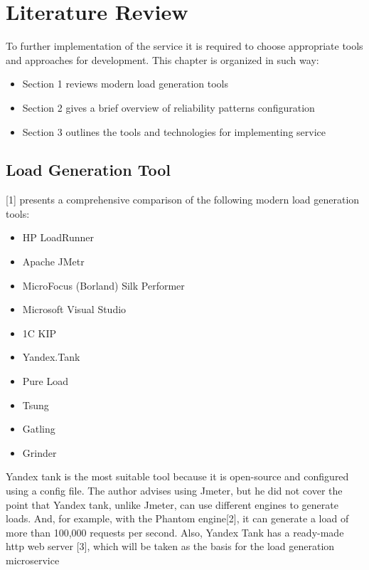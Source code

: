 
\chapter{Literature Review}
\label{ch:lr}


To further implementation of the service it is required to choose appropriate tools and approaches for development.
This chapter is organized in such way:

\begin{itemize}
    \item Section 1 reviews modern load generation tools
    \item Section 2 gives a brief overview of reliability patterns configuration
    \item Section 3 outlines the tools and technologies for implementing service
\end{itemize}

\section{Load Generation Tool}\label{sec:load-generation}
[1] presents a comprehensive comparison of the following modern load generation tools:
\begin{itemize}
    \item HP LoadRunner
    \item Apache JMetr
    \item MicroFocus (Borland) Silk Performer
    \item Microsoft Visual Studio
    \item 1C KIP
    \item Yandex.Tank
    \item Pure Load
    \item Tsung
    \item Gatling
    \item Grinder
\end{itemize}

Yandex tank is the most suitable tool because it is open-source and configured using a config file.
The author advises using Jmeter, but he did not cover the point that Yandex tank,
unlike Jmeter, can use different engines to generate loads.
And, for example, with the Phantom engine[2], it can generate
a load of more than 100,000 requests per second.
Also, Yandex Tank has a ready-made http web server [3], which will be taken as
the basis for the load generation microservice

